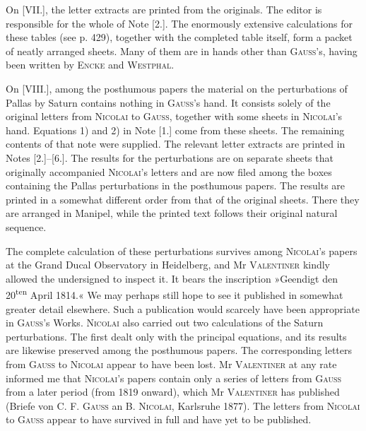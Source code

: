 \clearpage
\begingroup
{}
\renewcommand{\headrulewidth}{0pt}
\par\noindent\hspace*{\parindent}On [VII.], the letter extracts are printed from the originals. The editor
is responsible for the whole of Note [2.]. The enormously extensive
calculations for these tables (see p. 429), together with the completed table itself, form
a packet of neatly arranged sheets. Many of them are in hands other than
\textsc{Gauss}'s, having been written by \textsc{Encke} and \textsc{Westphal}.

\par\noindent\hspace*{\parindent}On [VIII.], among the posthumous papers the material on the perturbations of Pallas by Saturn
contains nothing in \textsc{Gauss}'s hand. It consists solely of the original letters from
\textsc{Nicolai} to \textsc{Gauss}, together with some sheets in \textsc{Nicolai}'s hand.
Equations 1) and 2) in Note [1.] come from these sheets. The remaining
contents of that note were supplied. The relevant letter extracts
are printed in Notes [2.]--[6.]. The results for the perturbations are on
separate sheets that originally accompanied \textsc{Nicolai}'s letters
and are now filed among the boxes containing the Pallas perturbations in the posthumous papers.
The results are printed in a somewhat different order from that of the
original sheets. There they are arranged in Manipel, while the printed
text follows their original natural sequence.

\par\noindent\hspace*{\parindent}The complete calculation of these perturbations survives among \textsc{Nicolai}'s papers
at the Grand Ducal Observatory in Heidelberg, and Mr
\textsc{Valentiner} kindly allowed the undersigned
to inspect it. It bears the inscription »Geendigt den
20\textsuperscript{ten} April 1814.« We may perhaps still hope to see it published
in somewhat greater detail elsewhere. Such a publication would scarcely have been appropriate in \textsc{Gauss}'s Works.
\textsc{Nicolai} also carried out two calculations of the
Saturn perturbations. The first dealt only with the principal equations,
and its results are likewise preserved among the posthumous papers. The corresponding
letters from \textsc{Gauss} to \textsc{Nicolai} appear to have been lost. Mr
\textsc{Valentiner} at any rate informed me that \textsc{Nicolai}'s papers contain only
a series of letters from \textsc{Gauss} from a later period (from 1819 onward),
which Mr \textsc{Valentiner} has published (Briefe von C. F.
\textsc{Gauss} an B. \textsc{Nicolai}, Karlsruhe 1877). The letters from \textsc{Nicolai}
to \textsc{Gauss} appear to have survived in full and have yet to
be published.

